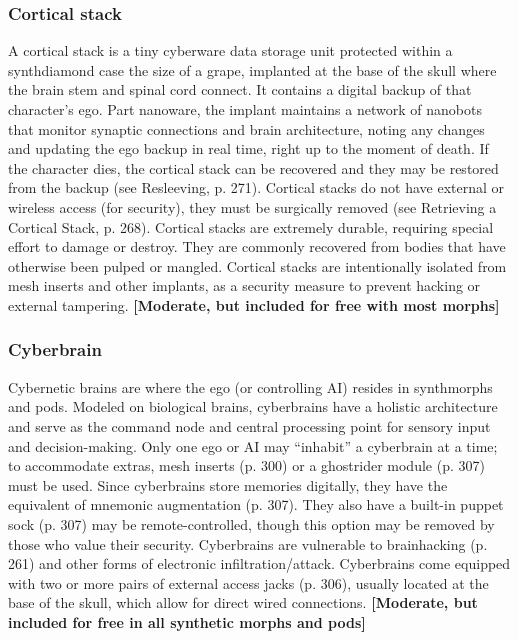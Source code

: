 \subsubsection{Cortical stack} A cortical stack is a tiny cyberware data storage unit protected within a synthdiamond case the size of a grape, implanted at the base of the skull where the brain stem and spinal cord connect. It contains a digital backup of that character’s ego. Part nanoware, the implant maintains a network of nanobots that monitor synaptic connections and brain architecture, noting any changes and updating the ego backup in real time, right up to the moment of death. If the character dies, the cortical stack can be recovered and they may be restored from the backup (see Resleeving, p. 271). Cortical stacks do not have external or wireless access (for security), they must be surgically removed (see Retrieving a Cortical Stack, p. 268). Cortical stacks are extremely durable, requiring special effort to damage or destroy. They are commonly recovered from bodies that have otherwise been pulped or mangled. Cortical stacks are intentionally isolated from mesh inserts and other implants, as a security measure to prevent hacking or external tampering. \textbf{[Moderate, but included for free with most morphs]}

\subsubsection{Cyberbrain}

Cybernetic brains are where the ego (or controlling AI) resides in synthmorphs and pods. Modeled on biological brains, cyberbrains have a holistic architecture and serve as the command node and central processing point for sensory input and decision-making. Only one ego or AI may ``inhabit'' a cyberbrain at a time; to accommodate extras, mesh inserts (p. 300) or a ghostrider module (p. 307) must be used. Since cyberbrains store memories digitally, they have the equivalent of mnemonic augmentation (p. 307). They also have a built-in puppet sock (p. 307) may be remote-controlled, though this option may be removed by those who value their security. Cyberbrains are vulnerable to brainhacking (p. 261) and other forms of electronic infiltration/attack. Cyberbrains come equipped with two or more pairs of external access jacks (p. 306), usually located at the base of the skull, which allow for direct wired connections. \textbf{[Moderate, but included for free in all synthetic morphs and pods]}

